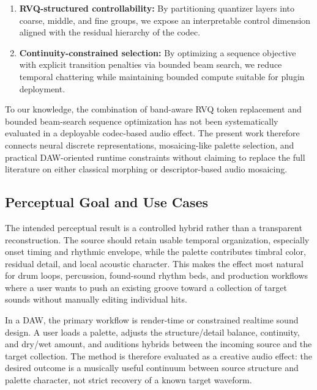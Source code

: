\documentclass[twoside,a4paper]{article}
\begin{document}
\begin{enumerate}
    \item \textbf{RVQ-structured controllability:} By partitioning quantizer layers into coarse, middle, and fine groups, we expose an interpretable control dimension aligned with the residual hierarchy of the codec.
    \item \textbf{Continuity-constrained selection:} By optimizing a sequence objective with explicit transition penalties via bounded beam search, we reduce temporal chattering while maintaining bounded compute suitable for plugin deployment.
\end{enumerate}

To our knowledge, the combination of band-aware RVQ token replacement and bounded beam-search sequence optimization has not been systematically evaluated in a deployable codec-based audio effect. The present work therefore connects neural discrete representations, mosaicing-like palette selection, and practical DAW-oriented runtime constraints without claiming to replace the full literature on either classical morphing or descriptor-based audio mosaicing.

\subsection{Perceptual Goal and Use Cases}

The intended perceptual result is a controlled hybrid rather than a transparent reconstruction. The source should retain usable temporal organization, especially onset timing and rhythmic envelope, while the palette contributes timbral color, residual detail, and local acoustic character. This makes the effect most natural for drum loops, percussion, found-sound rhythm beds, and production workflows where a user wants to push an existing groove toward a collection of target sounds without manually editing individual hits.

In a DAW, the primary workflow is render-time or constrained realtime sound design. A user loads a palette, adjusts the structure/detail balance, continuity, and dry/wet amount, and auditions hybrids between the incoming source and the target collection. The method is therefore evaluated as a creative audio effect: the desired outcome is a musically useful continuum between source structure and palette character, not strict recovery of a known target waveform.

\end{document}
